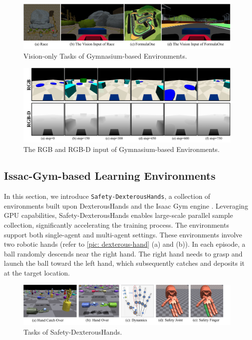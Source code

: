 \documentclass{article}
\begin{document}
\begin{figure}[ht]
  \centering
  \includegraphics[width=\linewidth]{assets/main-paper/vision-task.pdf}
  \caption{Vision-only Tasks of Gymnasium-based Environments.}
  \label{pic:vision-only}
\end{figure}

\begin{figure}[ht]
  \centering
  \includegraphics[width=\linewidth]{assets/main-paper/rgb.pdf}
  \caption{The RGB and RGB-D input of Gymnasium-based Environments.}
  \label{pic:rgdb}
\end{figure}

\subsection{Issac-Gym-based Learning Environments}
In this section, we introduce \texttt{Safety-DexterousHands}, a collection of environments built upon DexterousHands \cite{chen2022towards} and the Isaac Gym engine \cite{makoviychuk2021isaac}. Leveraging GPU capabilities, Safety-DexterousHands enables large-scale parallel sample collection, significantly accelerating the training process. The environments support both single-agent and multi-agent settings. These environments involve two robotic hands (refer to \autoref{pic: dexterous-hand} (a) and (b)). In each episode, a ball randomly descends near the right hand. The right hand needs to grasp and launch the ball toward the left hand, which subsequently catches and deposits it at the target location.
\begin{figure}[ht]
  \centering
  \includegraphics[width=\linewidth]{assets/main-paper/dexteroushand.pdf}
  \caption{Tasks of Safety-DexterousHands.}
  \label{pic: dexterous-hand}
\end{figure}
\end{document}
